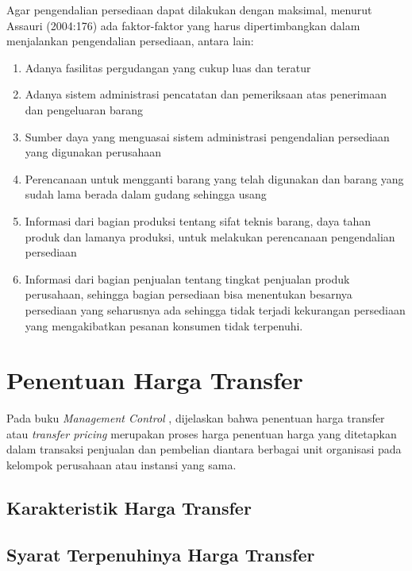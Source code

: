 Agar pengendalian persediaan dapat dilakukan dengan maksimal, menurut Assauri (2004:176) ada faktor-faktor yang harus dipertimbangkan dalam menjalankan pengendalian persediaan, antara lain:

\begin{enumerate}
	\item Adanya fasilitas pergudangan yang cukup luas dan teratur
	\item Adanya sistem administrasi pencatatan dan pemeriksaan atas penerimaan dan pengeluaran barang
	\item Sumber daya yang menguasai sistem administrasi pengendalian persediaan yang digunakan perusahaan
	\item Perencanaan untuk mengganti barang yang telah digunakan dan barang yang sudah lama berada dalam gudang sehingga usang
	\item Informasi dari bagian produksi tentang sifat teknis barang, daya tahan produk dan lamanya produksi, untuk melakukan perencanaan pengendalian persediaan
	\item Informasi dari bagian penjualan tentang tingkat penjualan produk perusahaan, sehingga bagian persediaan bisa menentukan besarnya persediaan yang seharusnya ada sehingga tidak terjadi kekurangan persediaan yang mengakibatkan pesanan konsumen tidak terpenuhi.
\end{enumerate}

\section{Penentuan Harga Transfer}

Pada buku \textit{Management Control} \citep{manajemencontrol}, dijelaskan bahwa penentuan harga transfer atau \textit{transfer pricing} merupakan proses harga penentuan harga yang ditetapkan dalam transaksi penjualan dan pembelian diantara berbagai unit organisasi pada kelompok perusahaan atau instansi yang sama.

\subsection{Karakteristik Harga Transfer}
\subsection{Syarat Terpenuhinya Harga Transfer}

